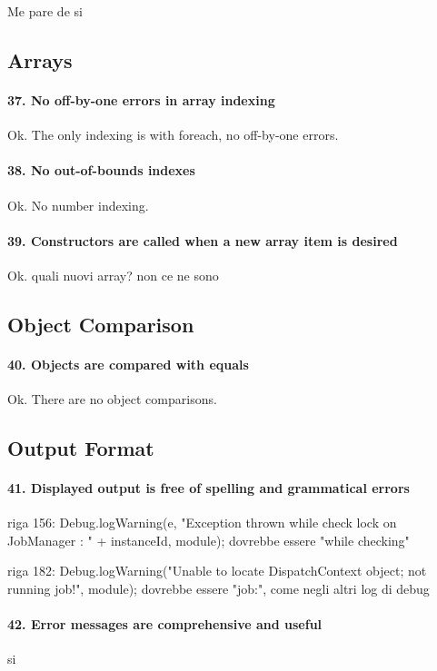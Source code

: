\documentclass[english]{article}
\begin{document}
Me pare de si


\subsection{Arrays}
\paragraph{37. No off-by-one errors in array indexing}
Ok.
The only indexing is with foreach, no off-by-one errors.

\paragraph{38. No out-of-bounds indexes}
Ok.
No number indexing.

\paragraph{39. Constructors are called when a new array item is desired}
Ok.
quali nuovi array? non ce ne sono

\subsection{Object Comparison}
\paragraph{40. Objects are compared with equals}
Ok.
There are no object comparisons.

\subsection{Output Format}
\paragraph{41. Displayed output is free of spelling and grammatical errors}
riga 156:
Debug.logWarning(e, "Exception thrown while check lock on JobManager : " + instanceId, module);
dovrebbe essere "while checking"

riga 182:
Debug.logWarning("Unable to locate DispatchContext object; not running job!", module);
dovrebbe essere "job:", come negli altri log di debug


\paragraph{42. Error messages are comprehensive and useful}
si
\end{document}
